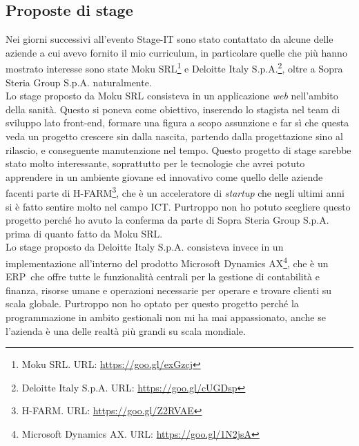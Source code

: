
\subsection{Proposte di stage}

Nei giorni successivi all'evento Stage-IT sono stato contattato da alcune delle aziende a cui avevo fornito il mio curriculum, in particolare quelle che più hanno mostrato interesse sono state Moku SRL\footnote{Moku SRL. URL: \url{https://goo.gl/exGzcj}} e Deloitte Italy S.p.A.\footnote{Deloitte Italy S.p.A. URL: \url{https://goo.gl/cUGDsp}}, oltre a Sopra Steria Group S.p.A. naturalmente.\\

Lo stage proposto da Moku SRL consisteva in un applicazione \textit{web} nell'ambito della sanità. Questo si poneva come obiettivo, inserendo lo stagista nel team di sviluppo lato front-end\glossario, formare una figura a scopo assunzione e far sì che questa veda un progetto crescere sin dalla nascita, partendo dalla progettazione sino al rilascio, e conseguente manutenzione nel tempo. Questo progetto di stage sarebbe stato molto interessante, soprattutto per le tecnologie che avrei potuto apprendere in un ambiente giovane ed innovativo come quello delle aziende facenti parte di H-FARM\footnote{H-FARM. URL: \url{https://goo.gl/Z2RVAE}}, che è un acceleratore di \textit{startup} che negli ultimi anni si è fatto sentire molto nel campo ICT. Purtroppo non ho potuto scegliere questo progetto perché ho avuto la conferma da parte di Sopra Steria Group S.p.A. prima di quanto fatto da Moku SRL.\\

Lo stage proposto da Deloitte Italy S.p.A. consisteva invece in un implementazione all'interno del prodotto Microsoft Dynamics AX\footnote{Microsoft Dynamics AX. URL: \url{https://goo.gl/1N2jsA}}, che è un ERP\glossario\ che offre tutte le funzionalità centrali per la gestione di contabilità e finanza, risorse umane e operazioni necessarie per operare e trovare clienti su scala globale. Purtroppo non ho optato per questo progetto perché la programmazione in ambito gestionali non mi ha mai appassionato, anche se l'azienda è una delle realtà più grandi su scala mondiale.\\

